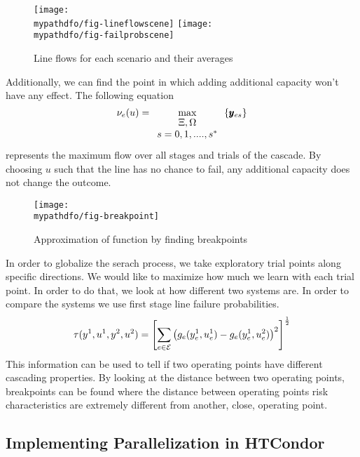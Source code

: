 \begin{figure}
\centering
\texttt{[image: \\mypathdfo/fig-lineflowscene]}
\texttt{[image: \\mypathdfo/fig-failprobscene]}
 \caption{Line flows for each scenario and  their averages}
\label{fig:flows}
\end{figure}


Additionally, we can find the point in which adding additional capacity won't have any effect.    The following equation 
\begin{equation}
\nu_e(u) = \max_{\begin{array}{c}\Xi,\Omega\\s=0,1,....,s^*\end{array}} \left\{ \pmb{y}_{es} \right\}
\end{equation}
represents the maximum flow over all stages and trials of the cascade.   By choosing $u$ such that the line has no chance to fail, any additional capacity does not change the outcome.



\begin{figure}
\centering
\texttt{[image: \\mypathdfo/fig-breakpoint]}
  \caption{Approximation of function by finding breakpoints}
\label{fig:break}
\end{figure}

In order to globalize the serach process, we take exploratory trial points along specific directions.  We would like to maximize how much we learn with each trial point.  In order to do that, we look at how different two systems are.  In order to compare the systems we use first stage line failure probabilities.
\begin{equation}
\tau (y^1,u^1, y^2,u^2) = \left[ \sum_{e \in \mathcal{E}} \left( g_e(y^1_e,u^1_e) - g_e(y^1_e,u^2_e) \right)^2 \right]^{\frac{1}{2}}
\end{equation}
This information can be used to tell if two operating points have different cascading properties.  By looking at the distance between two operating points, breakpoints can be found where the distance between operating points risk characteristics are extremely different from another, close, operating point.







\subsection{Implementing Parallelization in HTCondor}

